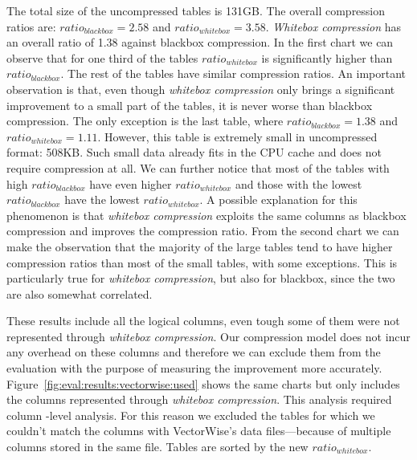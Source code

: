The total size of the uncompressed tables is 131GB. The overall compression ratios are:  \(ratio_{blackbox} = 2.58\) and \(ratio_{whitebox} = 3.58\). \textit{Whitebox compression} has an overall ratio of 1.38 against blackbox compression. In the first chart we can observe that for one third of the tables \(ratio_{whitebox}\) is significantly higher than \(ratio_{blackbox}\). The rest of the tables have similar compression ratios. 
An important observation is that, even though \textit{whitebox compression} only brings a significant improvement to a small part of the tables, it is never worse than blackbox compression. The only exception is the last table, where \(ratio_{blackbox} = 1.38\) and \(ratio_{whitebox} = 1.11\). However, this table is extremely small in uncompressed format: 508KB. Such small data already fits in the CPU cache and does not require compression at all. We can further notice that most of the tables with high \(ratio_{blackbox}\) have even higher \(ratio_{whitebox}\) and those with the lowest \(ratio_{blackbox}\) have the lowest \(ratio_{whitebox}\). A possible explanation for this phenomenon is that \textit{whitebox compression} exploits the same columns as blackbox compression and improves the compression ratio. From the second chart we can make the observation that the majority of the large tables tend to have higher compression ratios than most of the small tables, with some exceptions. This is particularly true for \textit{whitebox compression}, but also for blackbox, since the two are also somewhat correlated.

These results include all the logical columns, even tough some of them were not represented through \textit{whitebox compression}. Our compression model does not incur any overhead on these columns and therefore we can exclude them from the evaluation with the purpose of measuring the improvement more accurately. Figure~\ref{fig:eval:results:vectorwise:used} shows the same charts but only includes the columns represented through \textit{whitebox compression}. This analysis required column -level analysis. For this reason we excluded the tables for which we couldn't match the columns with VectorWise's data files---because of multiple columns stored in the same file. Tables are sorted by the new \(ratio_{whitebox}\).

